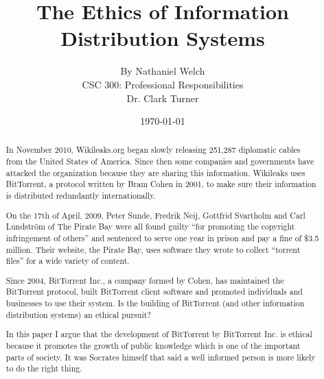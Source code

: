 \documentclass[11pt]{article}
\begin{document}
\title{\vfill The Ethics of Information Distribution Systems} %
\author{
By Nathaniel Welch\vspace{10pt}\\
CSC 300: Professional Responsibilities\vspace{10pt}\\
Dr. Clark Turner\vspace{10pt}\\
}
\date{\today}

\maketitle

\vfill
\begin{abstract}
In November 2010, Wikileaks.org began slowly releasing 251,287 diplomatic cables from the United States of America. \cite{cablegate} Since then some companies and governments have attacked the organization because they are sharing this information. Wikileaks uses BitTorrent, a protocol written by Bram Cohen in 2001, to make sure their information is distributed redundantly internationally.

On the 17th of April, 2009, Peter Sunde, Fredrik Neij, Gottfrid Svartholm and Carl Lundström of The Pirate Bay were all found guilty ``for promoting the copyright infringement of others'' and sentenced to serve one year in prison and pay a fine of \$3.5 million. \cite{tpbverdict} Their website, the Pirate Bay, uses software they wrote to collect ``torrent files'' for a wide variety of content.

Since 2004, BitTorrent Inc., a company formed by Cohen, has maintained the BitTorrent protocol, built BitTorrent client software and promoted individuals and businesses to use their system. Is the building of BitTorrent (and other information distribution systems) an ethical pursuit?

In this paper I argue that the development of BitTorrent by BitTorrent Inc. is ethical because it promotes the growth of public knowledge which is one of the important parts of society. It was Socrates himself that said a well informed person is more likely to do the right thing.
\end{abstract}

\thispagestyle{empty}
\newpage
\doublespacing

\thispagestyle{empty}
\tableofcontents
\newpage

\end{document}
